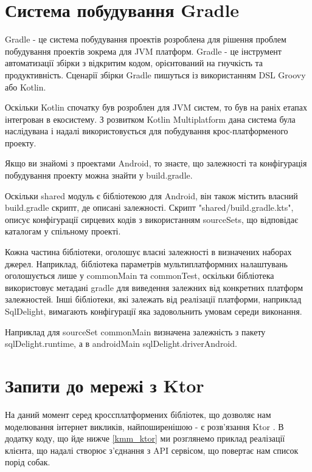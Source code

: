 \section{Система побудування Gradle}
\label{section.2.9}

Gradle - це система побудування проектів розроблена для рішення проблем побудування проектів зокрема для JVM платформ.
Gradle - це інструмент автоматизації збірки з відкритим кодом, орієнтований на гнучкість та продуктивність. \cite{gradle_user_manual}
Сценарії збірки Gradle пишуться із використанням DSL Groovy або Kotlin. \cite{gradle_user_manual}

Оскільки Kotlin спочатку був розроблен для JVM систем, то був на раніх етапах інтегрован в екосистему.
З розвитком Kotlin Multiplatform дана система була наслідувана і надалі використовується для побудування крос-платформеного проекту.

Якщо ви знайомі з проектами Android, то знаєте, що залежності та конфігурація побудування проекту можна знайти у build.gradle.

Оскільки shared модуль є бібліотекою для Android, він також містить власний build.gradle скрипт, де описані залежності.
Скрипт "shared/build.gradle.kts", описує конфігурації сирцевих кодів з використанням sourceSets, що відповідає каталогам у спільному проекті.

Кожна частина бібліотеки, оголошує власні залежності в визначених наборах джерел.
Наприклад, бібліотека параметрів мультиплатформних налаштувань оголошується лише у commonMain та commonTest,
оскільки бібліотека використовує метадані gradle для виведення залежних від конкретних платформ залежностей.
Інші бібліотеки, які залежать від реалізації платформи, наприклад SqlDelight, вимагають конфігурації яка задовольнить
умовам середи виконання.

Наприклад для sourceSet commonMain визначена залежність з пакету sqlDelight.runtime, а в androidMain sqlDelight.driverAndroid.


\section{Запити до мережі з Ktor}
\label{section.2.10}
На даний момент серед кроссплатформених бібліотек, що дозволяє нам моделювання інтернет викликів, найпоширенішою - є розв'язання Ktor \cite{ktor_home_page}.
В додатку коду, що йде нижче \ref{kmm_ktor} ми розглянемо приклад реалізації клієнта, що надалі створює з'єднання з API сервісом, що повертає нам список порід собак.

